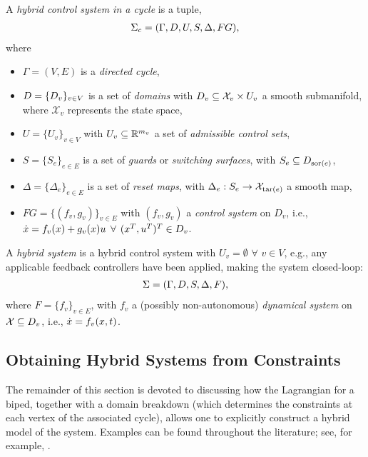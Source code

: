 \begin{definition} A {\em hybrid control system in a cycle} is a tuple,
  \begin{align}
    \Sigma_{c} = (\Gamma, D, U, S, \Delta, FG),
  \end{align}
  where
  \begin{itemize}
  \item $\Gamma = (V,E)$ is a {\em directed cycle},
  \item $D = \{D_{v}\}_{v \in V}$ is a set of {\em domains} with $D_{v}
    \subseteq \mathcal{X}_{v} \times U_v$ a smooth submanifold, where
    $\mathcal{X}_{v}$ represents the state space,
  \item $U = \{U_{v}\}_{v \in V}$ with $U_{v} \subseteq \mathbb{R}^{m_{v}}$ a set of
    {\em admissible control sets},
  \item $S = \{S_{e}\}_{e \in E}$ is a set of {\em guards} or {\em switching
      surfaces}, with $S_{e} \subseteq D_{\mathrm{sor}(e)}$,
  \item $\Delta = \{\Delta_{e}\}_{e \in E}$ is a set of {\em reset maps}, with
    $\Delta_{e} : S_{e} \to \mathcal{X}_{\mathrm{tar}(e)}$ a smooth map,
  \item $FG = \{(f_{v}, g_{v})\}_{v \in E}$ with $(f_v,g_v)$ a {\em control
      system} on $D_{v}$, i.e., $\dot{x} = f_{v}(x) + g_{v}(x) u$ $\forall$
    $(x^{T}, u^{T})^{T} \in D_{v}$.
  \end{itemize}
\end{definition}

\begin{definition}
  A {\em hybrid system} is a hybrid control system with $U_v = \emptyset$
  $\forall$ $v \in V$, e.g., any applicable feedback controllers have been
  applied, making the system closed-loop:
  \begin{align}
    \Sigma = (\Gamma, D, S, \Delta, F),
  \end{align}
  where $F = \{f_{v}\}_{v \in E}$, with $f_{v}$ a (possibly non-autonomous) {\em
    dynamical system} on $\mathcal{X} \subseteq D_{v}$, i.e., ${\dot {x}} =
  f_{v}(x,t)$.
\end{definition}

\subsection{Obtaining Hybrid Systems from Constraints}
The remainder of this section is devoted to discussing how the Lagrangian for a
biped, together with a domain breakdown (which determines the constraints at
each vertex of the associated cycle), allows one to explicitly construct a
hybrid model of the system.
%
Examples can be found throughout the literature; see, for example, \cite{Grizzle2010,Grizzle2014,Sinnet2009}.


